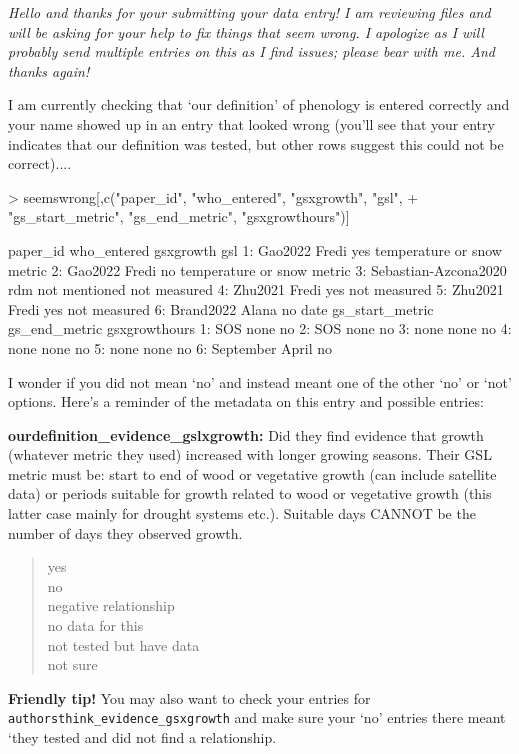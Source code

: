 \documentclass[11pt]{article}
\begin{document}
\renewcommand{\refname}{\CHead{}}

\emph{Hello and thanks for your submitting your data entry! I am reviewing files and will be asking for your help to fix things that seem wrong. I apologize as I will probably send multiple entries on this as I find issues; please bear with me. And thanks again!}

I am currently checking that `our definition' of phenology is entered correctly and your name showed up in an entry that looked wrong (you'll see that your entry indicates that our definition was tested, but other rows suggest this could not be correct)....


\begin{Schunk}
\begin{Sinput}
> seemswrong[,c("paper_id", "who_entered", "gsxgrowth", "gsl", 
+ 	"gs_start_metric", "gs_end_metric", "gsxgrowthours")]
\end{Sinput}
\begin{Soutput}
               paper_id who_entered     gsxgrowth                        gsl
1:              Gao2022       Fredi           yes temperature or snow metric
2:              Gao2022       Fredi            no temperature or snow metric
3: Sebastian-Azcona2020         rdm not mentioned               not measured
4:              Zhu2021       Fredi           yes               not measured
5:              Zhu2021       Fredi           yes               not measured
6:            Brand2022       Alana            no                       date
   gs_start_metric gs_end_metric gsxgrowthours
1:             SOS          none            no
2:             SOS          none            no
3:            none          none            no
4:            none          none            no
5:            none          none            no
6:       September         April            no
\end{Soutput}
\end{Schunk}

I wonder if you did not mean `no' and instead meant one of the other `no' or `not' options. Here's a reminder of the metadata on this entry and possible entries:

{\bf ourdefinition\_evidence\_gslxgrowth:} Did they find evidence that growth (whatever metric they used) increased with longer growing seasons. Their GSL metric must be: start to end of wood or vegetative growth (can include satellite data) or periods suitable for growth related to wood or vegetative growth (this latter case mainly for drought systems etc.). Suitable days CANNOT be the number of days they observed growth. 
\begin{quote}
	yes\\
	no\\
	negative relationship\\
	no data for this\\
	not tested but have data\\
	not sure\\
\end{quote}

{\bf Friendly tip!} You may also want to check your entries for \verb|authorsthink_evidence_gsxgrowth| and make sure your `no' entries there meant `they tested and did not find a relationship. 
\end{document}
